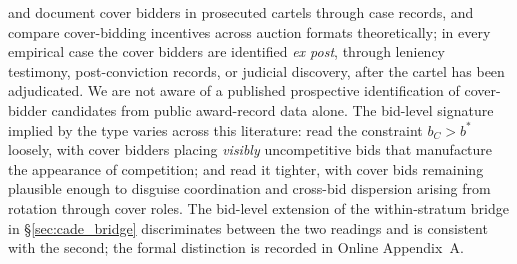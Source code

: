 \citet{porter1999ohio,pesendorfer2000study,asker2010leniency} and
\citet{marshall2012economics} document cover bidders in
prosecuted cartels through case records, and
\citet{athey2011comparing} compare cover-bidding incentives
across auction formats theoretically; in every empirical case the
cover bidders are identified \emph{ex post}, through leniency
testimony, post-conviction records, or judicial discovery, after
the cartel has been adjudicated. We are not aware of a published
prospective identification of cover-bidder candidates from public
award-record data alone. The bid-level signature implied by the
type varies across this literature:
\citet{porter1993detection,bajari2003deciding} read the
constraint $b_C > b^*$ loosely, with cover bidders placing
\emph{visibly} uncompetitive bids that manufacture the appearance
of competition; \citet{marshall2012economics} and
\citet{asker2010leniency} read it tighter, with cover bids
remaining plausible enough to disguise coordination and
cross-bid dispersion arising from rotation through cover roles.
The bid-level extension of the within-stratum bridge in
\S\ref{sec:cade_bridge} discriminates between the two readings
and is consistent with the second; the formal distinction is
recorded in Online Appendix~A.
